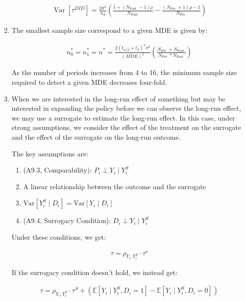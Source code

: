 \documentclass[10pt]{article}
\begin{document}
\begin{enumerate}
        \begin{align}
            \operatorname{Var}\left[\tau^{D I D}\right]=\frac{2 \sigma^2}{n_d}\left(\frac{1+\left(N_{\text {Post }}-1\right) \rho}{N_{\text {Post }}}-\frac{\left(N_{\text {Pre }}+1\right) \rho-1}{N_{\text {Pre }}}\right)
        \end{align}
        
    \item The smallest sample size correspond to a 
        given MDE is given by:
        
        \begin{align}
            n_0^*=n_1^*=n^*=\frac{2\left(t_{\alpha / 2}+t_\beta\right)^2 \sigma^2}{(M D E)^2}\left(\frac{N_{\text {Pre }}+N_{\text {Post }}}{N_{\text {Pre }} * N_{\text {Post }}}\right)
        \end{align}
        
        As the number of periods increases from 4 to 16, the 
        minimum sample size required to detect a given MDE
        decreases four-fold.
    \item When we are interested in the long-run effect of something 
    but may be interested in expanding the policy before we 
    can observe the long-run effect, we may use a surrogate
    to estimate the long-run effect. In this case, under strong assumptions,
    we consider the effect of the treatment on the surrogate
    and the effect of the surrogate on the long-run outcome.
    
    The key assumptions are:
    
    \begin{notes}[Assumptions]
        \begin{enumerate}
            \item (A9.3, Comparability): $P_i \perp Y_i \mid Y_i^S$
            \item A linear relationship between the outcome and the surrogate
            \item $\text{Var}\left[Y_i^S \mid D_i\right]=\text{Var}\left[Y_i \mid D_i\right]$
            \item (A9.4, Surrogacy Condition): $D_i \perp Y_i \mid Y_i^S$
        \end{enumerate}
    \end{notes}
    
    Under these conditions, we get:
    
    \begin{align}
        \tau=\rho_{Y_i, Y_i^S} \cdot \tau^s
    \end{align}
    
    If the surrogacy condition doesn't hold, we instead get:
    
    \begin{align}
        \tau=\rho_{Y_i, Y_i^S} \cdot \tau^S+\left(\mathbb{E}\left[Y_i \mid Y_i^S, D_i=1\right]-\mathbb{E}\left[Y_i \mid Y_i^S, D_i=0\right]\right)
    \end{align}
\end{enumerate}
\end{document}
